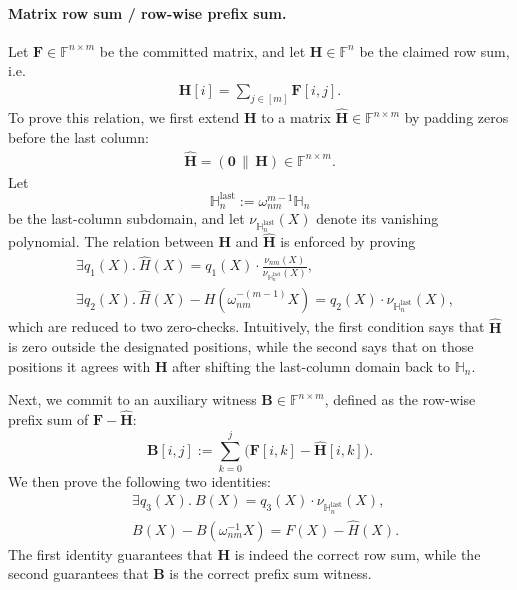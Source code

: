 \paragraph{Matrix row sum / row-wise prefix sum.}
Let $\mathbf{F}\in\mathbb{F}^{n\times m}$ be the committed matrix, and let
$\mathbf{H}\in\mathbb{F}^{n}$ be the claimed row sum, i.e.
\begin{align}
    \mathbf{H}[i] = \sum_{j\in[m]} \mathbf{F}[i,j].
\end{align}
To prove this relation, we first extend $\mathbf{H}$ to a matrix
$\widehat{\mathbf{H}}\in\mathbb{F}^{n\times m}$ by padding zeros before the
last column:
\begin{align}
    \widehat{\mathbf{H}} = (\mathbf{0}\,\|\,\mathbf{H}) \in \mathbb{F}^{n\times m}.
\end{align}
Let
\[
    \mathbb{H}_{n}^{\mathrm{last}}
    :=
    \omega_{nm}^{m-1}\mathbb{H}_n
\]
be the last-column subdomain, and let
$\nu_{\mathbb{H}_{n}^{\mathrm{last}}}(X)$ denote its vanishing polynomial.
The relation between $\mathbf{H}$ and $\widehat{\mathbf{H}}$ is enforced by
proving
\begin{align}
    &\exists q_1(X).\ 
    \widehat{H}(X)
    =
    q_1(X)\cdot
    \frac{\nu_{nm}(X)}{\nu_{\mathbb{H}_{n}^{\mathrm{last}}}(X)},\\
    &\exists q_2(X).\
    \widehat{H}(X)-H(\omega_{nm}^{-(m-1)}X)
    =
    q_2(X)\cdot \nu_{\mathbb{H}_{n}^{\mathrm{last}}}(X),
\end{align}
which are reduced to two zero-checks.
Intuitively, the first condition says that $\widehat{\mathbf{H}}$ is zero
outside the designated positions, while the second says that on those positions
it agrees with $\mathbf{H}$ after shifting the last-column domain back to
$\mathbb{H}_n$.

Next, we commit to an auxiliary witness
$\mathbf{B}\in\mathbb{F}^{n\times m}$, defined as the row-wise prefix sum of
$\mathbf{F}-\widehat{\mathbf{H}}$:
\[
    \mathbf{B}[i,j]
    :=
    \sum_{k=0}^{j}\bigl(\mathbf{F}[i,k]-\widehat{\mathbf{H}}[i,k]\bigr).
\]
We then prove the following two identities:
\begin{align}
  &\exists q_3(X).\
  B(X) = q_3(X)\cdot \nu_{\mathbb{H}_{n}^{\mathrm{last}}}(X),\\
  &B(X)-B(\omega_{nm}^{-1}X)=F(X)-\widehat{H}(X).
\end{align}
The first identity guarantees that $\mathbf{H}$ is indeed the correct row sum,
while the second guarantees that $\mathbf{B}$ is the correct prefix sum witness.

